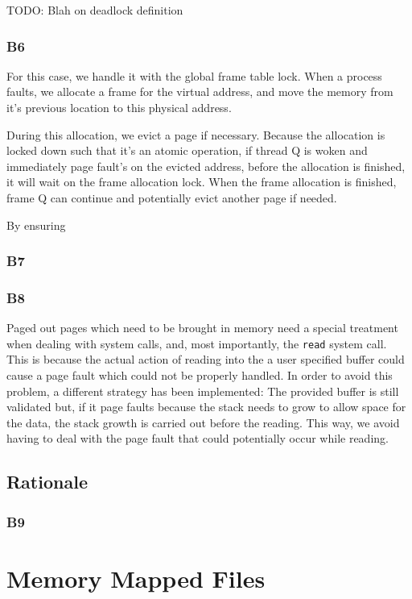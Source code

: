 \documentclass[a4wide, 11pt]{article}
\newcommand{\tx}{\texttt}
\begin{document}
TODO: Blah on deadlock definition


\subsubsection{B6}

For this case, we handle it with the global frame table lock. When a process faults, we allocate a frame for the virtual address, and move the memory from it's previous location to this physical address.

During this allocation, we evict a page if necessary. Because the allocation is locked down such that it's an atomic operation, if thread Q is woken and immediately page fault's on the evicted address, before the allocation is finished, it will wait on the frame allocation lock. When the frame allocation is finished, frame Q can continue and potentially evict another page if needed.

By ensuring 

\subsubsection{B7}

\subsubsection{B8}
Paged out pages which need to be brought in memory need a special treatment when dealing with system calls, and, most importantly, the \tx{read} system call. This is because the actual action of reading into the a user specified buffer could cause a page fault which could not be properly handled. In order to avoid this problem, a different strategy has been implemented: The provided buffer is still validated but, if it page faults because the stack needs to grow to allow space for the data, the stack growth is carried out before the reading. This way, we avoid having to deal with the page fault that could potentially occur while reading.  

\subsection{Rationale}
\subsubsection{B9}


\section{Memory Mapped Files}
\end{document}
